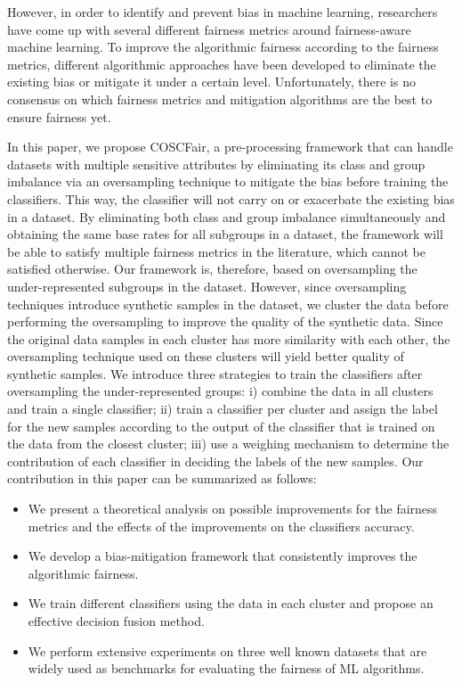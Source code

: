 However, in order to identify and prevent bias in machine learning, researchers have come up with several different fairness metrics around fairness-aware machine learning. To improve the algorithmic fairness according to the fairness metrics, different algorithmic approaches have been developed  to eliminate the existing bias or mitigate it under a certain level. Unfortunately, there is no consensus on which fairness metrics and mitigation algorithms are the best to ensure fairness yet.


In this paper, we propose COSCFair, a pre-processing framework that can handle datasets with multiple sensitive attributes by eliminating its class and group imbalance via an oversampling technique to mitigate the bias before training the classifiers. This way, the classifier will not carry on or exacerbate the existing bias in a dataset. By eliminating both class and group imbalance simultaneously and obtaining the same base rates for all subgroups in a dataset, the framework will be able to satisfy multiple fairness metrics in the literature, which cannot be satisfied otherwise. Our framework is, therefore, based on oversampling the under-represented subgroups in the dataset. However, since oversampling techniques introduce synthetic samples in the dataset, we cluster the data before performing the oversampling to improve the quality of the synthetic data. Since the original data samples in each cluster has more similarity with each other, the oversampling technique used on these clusters will yield better quality of synthetic samples. We introduce three strategies to train the classifiers after oversampling the under-represented groups: 
i) combine the data in all clusters and train a single classifier; 
ii) train a classifier per cluster and assign the label for the new samples according to the output of the classifier that is trained on the data from the closest cluster; 
iii) use a weighing mechanism to determine the contribution of each classifier in deciding the labels of the new samples. Our contribution in this paper can be summarized as follows:
\begin{itemize}
    \item We present a theoretical analysis on possible improvements for the fairness metrics and the effects of the improvements on the classifiers accuracy.
    \item We develop a bias-mitigation framework that consistently improves the algorithmic fairness. 
    \item We train different classifiers using the data in each cluster and propose an effective decision fusion method. 
    \item We perform extensive experiments on three well known datasets that are widely used as benchmarks for evaluating the fairness of ML algorithms.
    
\end{itemize}

